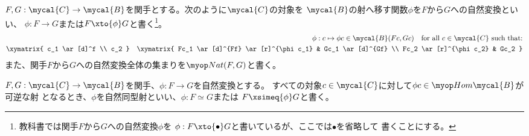 	\begin{definition}[自然変換]\label{def:自然変換} %
		$F,G:\mycal{C}\to\mycal{B}$を関手とする。次のように$\mycal{C}$の対象を
		$\mycal{B}$の射へ移す関数$\phi$を$F$から$G$への自然変換といい、
		$\phi:F\to G$または$F\xto{\phi}G$と書く\footnote{
			教科書\cite{maclane.work}では関手$F$から$G$への自然変換$\phi$を
			$\phi:F\xto{\bullet}G$と書いているが、ここでは$\bullet$を省略して
			書くことにする。
		}。
		\begin{equation*}\begin{split} %
			\phi: c\mapsto \phi c\in\mycal{B}(Fc,Gc)
			\quad\text{for all }c\in\mycal{C} \text{ such that:} \\
			\xymatrix {
				c_1 \ar[d]^f \\
				c_2
			}\quad \xymatrix {
				Fc_1 \ar[d]^{Ff} \ar[r]^{\phi c_1} & Gc_1 \ar[d]^{Gf} \\
				Fc_2 \ar[r]^{\phi c_2} & Gc_2
			}
		\end{split}\end{equation*} %
		また、関手$F$から$G$への自然変換全体の集まりを$\Nat(F,G)$と書く。
	\end{definition} %
	\begin{definition}[自然同型]\label{def:自然同型} %
		$F,G:\mycal{C}\to\mycal{B}$を関手、$\phi:F\to G$を自然変換とする。
		すべての対象$c\in\mycal{C}$に対して$\phi c\in\Hom\mycal{B}$が可逆な射
		となるとき、$\phi$を自然同型射といい、$\phi:F\simeq G$または
		$F\xsimeq{\phi}G$と書く。
	\end{definition} %

